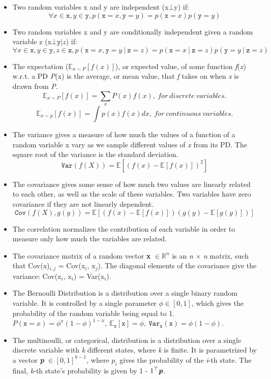 \documentclass{article}
\begin{document}
\begin{itemize}
\[\]
\item Two random variables x and y are independent (x\(\bot\)y) if: \[\forall x \in \mathtt{x}, y \in \mathtt{y}, p(\mathtt{x} = x, \mathtt{y} = y) = p(\mathtt{x} = x)p(\mathtt{y} = y)\]
\item Two random variables x and y are conditionally independent given a random variable z (x\(\bot \mathtt{y} | z\)) if: 
\[\forall x \in \mathtt{x}, y \in \mathtt{y}, z \in \mathtt{z}, p(\mathtt{x} = x, \mathtt{y} = y\ | \  \mathtt{z} = z) = p(\mathtt{x} = x\ | \  \mathtt{z} = z)p(\mathtt{y} = y\ | \  \mathtt{z} = z)\]
\item The expectation (\(\mathbb{E}_{x\sim P}[f(x)]\)), or expected value, of some function \textit{f}(\textit{x}) w.r.t. a PD \textit{P}(x) is the average, or mean value, that \textit{f} takes on when \textit{x} is drawn from \textit{P}.
\[
	\mathbb{E}_{x\sim P}[f(x)] = \sum_xP(x)f(x),\ for\ discrete\ variables.
\]\[
    \mathbb{E}_{x\sim p}[f(x)] = \int p(x)f(x)dx,\ for\ continuous\ variables.
\]
\item The variance gives a measure of how much the values of a function of a random variable x vary as we sample different values of \textit{x} from its PD. The square root of the variance is the standard deviation.
\[
	\mathtt{Var}(f(X)) = \mathbb{E}[(f(x) - \mathbb{E}[f(x)])^2]
\]
\item The covariance gives some sense of how much two values are linearly related to each other, as well as the scale of these variables. Two variables have zero covariance if they are not linearly dependent.
\[
	\mathtt{Cov}(f(X), g(y)) = \mathbb{E}[(f(x) - \mathbb{E}[f(x)])(g(y) - \mathbb{E}[g(y)])]
\]
\item The correlation normalizes the contribution of each variable in order to measure only how much the variables are related.
\item The covariance matrix of a random vector \textbf{x} \(\in \mathbb{R}^n\) is an \textit{n} \(\times\) \textit{n} matrix, such that Cov(x)\(_{i,j}\) = Cov(x\(_i\), x\(_j\)). The diagonal elements of the covariance give the variance: Cov(x\(_i\), x\(_i\)) = Var(x\(_i\)).
\item The Bernoulli Distribution is a distribution over a single binary random variable. It is controlled by a single parameter \(\phi \in [0, 1]\), which gives the probability of the random variable being equal to 1. \(P(\mathtt{x} = x) = \phi^x(1 - \phi)^{1-x},\ \mathbb{E}_{\mathtt{x}}[\mathtt{x}] = \phi,\ \mathtt{Var}_{\mathtt{x}}(\mathtt{x}) = \phi (1 - \phi)\).
\item The multinoulli, or categorical, distribution is a distribution over a single discrete variable with \textit{k} different states, where \textit{k} is finite. It is parametrized by a vector \textbf{\textit{p}} \(\in [0, 1]^{k-1}\), where \(p_i\) gives the probability of the \textit{i}-th state. The final, \textit{k}-th state's probability is given by 1 - \(1^\top\textbf{\textit{p}}\).

\end{itemize}
\end{document}
